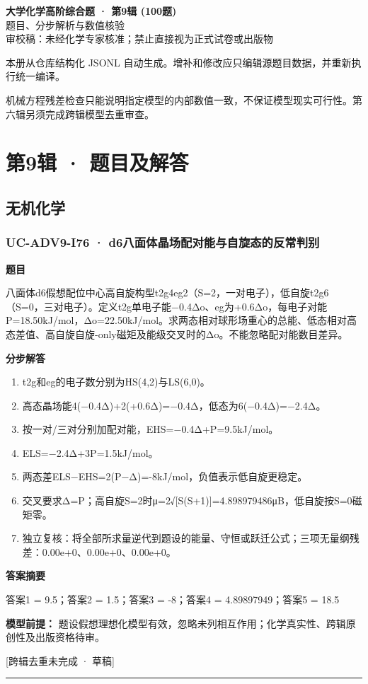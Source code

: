 \documentclass[UTF8,11pt,a4paper]{ctexart}
\begin{document}
\begin{center}
{\LARGE\bfseries 大学化学高阶综合题 · 第9辑 (100题)}\\[0.8em]
{\large 题目、分步解析与数值核验}\\[0.5em]
{\small \textcolor{red!65!black}{审校稿：未经化学专家核准；禁止直接视为正式试卷或出版物}}
\end{center}
\vspace{1em}
\noindent 本册从仓库结构化 JSONL 自动生成。增补和修改应只编辑源题目数据，并重新执行统一编译。
\par 机械方程残差检查只能说明指定模型的内部数值一致，不保证模型现实可行性。第六辑另须完成跨辑模型去重审查。
\tableofcontents
\clearpage
\section*{第9辑 · 题目及解答}
\subsection*{无机化学}
\subsubsection*{UC-ADV9-I76 · d6八面体晶场配对能与自旋态的反常判别}
\noindent\textbf{题目}\par
八面体d6假想配位中心高自旋构型t2g4eg2（S=2，一对电子），低自旋t2g6（S=0，三对电子）。定义t2g单电子能−0.4Δo、eg为+0.6Δo，每电子对能P=18.50kJ/mol，Δo=22.50kJ/mol。求两态相对球形场重心的总能、低态相对高态差值、高自旋自旋-only磁矩及能级交叉时的Δo。不能忽略配对能数目差异。\par
\medskip\noindent\textbf{分步解答}
\begin{enumerate}
\item t2g和eg的电子数分别为HS(4,2)与LS(6,0)。
\item 高态晶场能4(−0.4Δ)+2(+0.6Δ)=−0.4Δ，低态为6(−0.4Δ)=−2.4Δ。
\item 按一对/三对分别加配对能，EHS=−0.4Δ+P=9.5kJ/mol。
\item ELS=−2.4Δ+3P=1.5kJ/mol。
\item 两态差ELS−EHS=2(P−Δ)=-8kJ/mol，负值表示低自旋更稳定。
\item 交叉要求Δ=P；高自旋S=2时μ=2√[S(S+1)]=4.898979486μB，低自旋按S=0磁矩零。
\item 独立复核：将全部所求量逆代到题设的能量、守恒或跃迁公式；三项无量纲残差：0.00e+0、0.00e+0、0.00e+0。
\end{enumerate}
\noindent\textbf{答案摘要}\par
答案1 = 9.5；答案2 = 1.5；答案3 = -8；答案4 = 4.89897949；答案5 = 18.5\par
\noindent\textbf{模型前提：}
题设假想理想化模型有效，忽略未列相互作用；化学真实性、跨辑原创性及出版资格待审。\par
\noindent\textcolor{red!65!black}{[跨辑去重未完成 · 草稿]} \par
\medskip\hrule\medskip
{}
\end{document}
